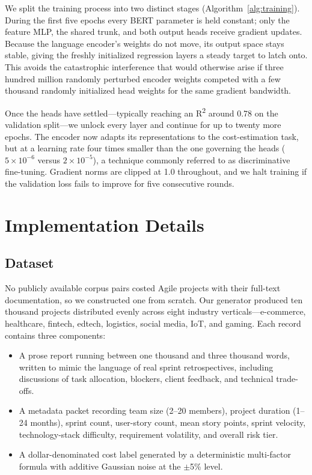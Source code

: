\documentclass[conference]{IEEEtran}
\begin{document}
We split the training process into two distinct stages (Algorithm~\ref{alg:training}). During the first five epochs every BERT parameter is held constant; only the feature MLP, the shared trunk, and both output heads receive gradient updates. Because the language encoder's weights do not move, its output space stays stable, giving the freshly initialized regression layers a steady target to latch onto. This avoids the catastrophic interference that would otherwise arise if three hundred million randomly perturbed encoder weights competed with a few thousand randomly initialized head weights for the same gradient bandwidth.

Once the heads have settled---typically reaching an R\textsuperscript{2} around 0.78 on the validation split---we unlock every layer and continue for up to twenty more epochs. The encoder now adapts its representations to the cost-estimation task, but at a learning rate four times smaller than the one governing the heads ($5 \times 10^{-6}$ versus $2 \times 10^{-5}$), a technique commonly referred to as discriminative fine-tuning. Gradient norms are clipped at 1.0 throughout, and we halt training if the validation loss fails to improve for five consecutive rounds.

\section{Implementation Details}

\subsection{Dataset}

No publicly available corpus pairs costed Agile projects with their full-text documentation, so we constructed one from scratch. Our generator produced ten thousand projects distributed evenly across eight industry verticals---e-commerce, healthcare, fintech, edtech, logistics, social media, IoT, and gaming. Each record contains three components:

\begin{itemize}
    \item A prose report running between one thousand and three thousand words, written to mimic the language of real sprint retrospectives, including discussions of task allocation, blockers, client feedback, and technical trade-offs.
    \item A metadata packet recording team size (2--20 members), project duration (1--24 months), sprint count, user-story count, mean story points, sprint velocity, technology-stack difficulty, requirement volatility, and overall risk tier.
    \item A dollar-denominated cost label generated by a deterministic multi-factor formula with additive Gaussian noise at the $\pm$5\% level.
\end{itemize}
\end{document}
